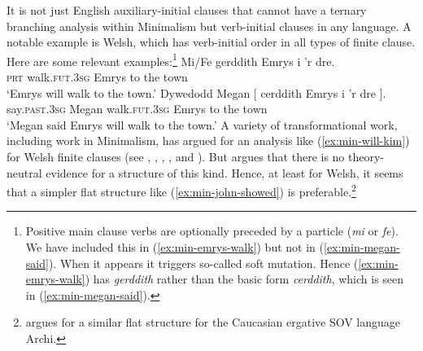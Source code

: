 \documentclass[output=paper]{langsci/langscibook}
\begin{document}
It is not just English auxiliary-initial clauses that cannot have a ternary branching analysis within Minimalism but verb-initial clauses in any language. A notable example is Welsh, which has verb-initial order in all types of finite clause. Here are some relevant examples:\footnote{%
	Positive main clause verbs are optionally preceded by a particle (\textit{mi} or \textit{fe}). We have included this in (\ref{ex:min-emrys-walk}) but not in (\ref{ex:min-megan-said}). When it appears it triggers so-called soft mutation. Hence (\ref{ex:min-emrys-walk}) has \textit{gerddith} rather than the basic form \textit{cerddith}, which is seen in (\ref{ex:min-megan-said}).
}
\eal
\ex\label{ex:min-emrys-walk}
\gll Mi/Fe gerddith Emrys i 'r dre.\\
\textsc{prt} walk.\textsc{fut}.\textsc{3sg} Emrys to the town\\
\glt`Emrys will walk to the town.'
\ex\label{ex:min-megan-said}
\gll Dywedodd Megan [ cerddith Emrys i 'r dre ].\\
say.\textsc{past}.\textsc{3sg} Megan {} walk.\textsc{fut}.\textsc{3sg} Emrys to the town {}\\
\glt`Megan said Emrys will walk to the town.'
\zl
A variety of transformational work, including work in Minimalism, has argued for an analysis like (\ref{ex:min-will-kim}) for Welsh finite clauses (see \eg \citealt{JonesThomas.1977}, \citealt{Sproat.1985}, \citealt{Sadler.1988}, \citealt{Rouveret.1994}, and \citealt{Roberts.2005}). But \citet{Borsley.2006b} argues that there is no theory-neutral evidence for a structure of this kind. Hence, at least for Welsh, it seems that a simpler flat structure like (\ref{ex:min-john-showed}) is preferable.\footnote{%
	\citet{Borsley.2016} argues for a similar flat structure for the Caucasian ergative SOV language Archi.%
}
\end{document}
